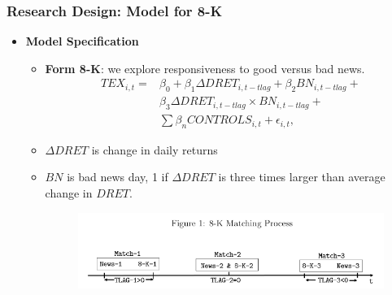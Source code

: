 \documentclass{beamer}
\begin{document}
\begin{frame}
\frametitle{Research Design: Model for 8-K}
\begin{itemize}
	
	\item \textbf{Model Specification}
	\begin{itemize}
	
		\item \textbf{Form 8-K}: we explore responsiveness to good versus bad news.
		\begin{equation}
		\begin{aligned}
		\label{eq2}
		TEX_{i,t}=
		&\beta_0+\beta_1\Delta DRET_{i,t-tlag}+\beta_2BN_{i,t-tlag}+\\
		&\beta_3\Delta DRET_{i,t-tlag}\times BN_{i,t-tlag}+\\
		&\sum\beta_nCONTROLS_{i,t}+\epsilon_{i,t},
		\end{aligned}
		\end{equation}
		
		\pause
				\item $\Delta DRET$ is change in daily returns
				\item $BN$ is bad news day, 1 if $\Delta DRET$ is three times larger than average change in $DRET$.
		
		\begin{figure}[h]
			\centering
			\includegraphics[width=1\linewidth]{fig1}
			\label{fig1}
		\end{figure}
	\end{itemize}
	
\end{itemize}
\end{frame}
\end{document}
